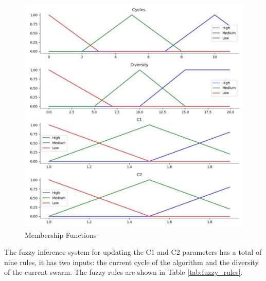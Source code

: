 \documentclass[runningheads]{llncs}
\begin{document}
\begin{figure} [htbp]
  \centering
  \includegraphics[angle=0,width=1\textwidth]{Figure_1.pdf}
  \caption{Membership Functions}
  \label{fig:member} 
\end{figure}

The fuzzy inference system for updating the C1 and C2 parameters has a  total of nine rules, it has two inputs: the current cycle of the algorithm and the diversity of the current swarm. The fuzzy rules are shown in Table \ref{tab:fuzzy_rules}. 
\end{document}

